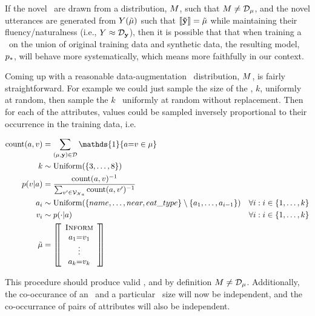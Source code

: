 If the novel \meaningrepresentations~are drawn from a distribution, 
$M$, such that $M \ne \mathcal{D}_{\mu}$, 
and the novel utterances are generated from $Y(\tilde{\mu})$
 such that $\left\llbracket \boldsymbol{\tilde{\mathbf{y}}} \right\rrbracket = \tilde{\mu}$
while maintaining their fluency/naturalness (i.e., $Y \approx \mathcal{D}_{\mathbf{y}}$),
then 
it is possible that that when training a \sequencetosequence~on the union 
of original training data and synthetic data, the resulting model, $p_*$,
 will behave
more systematically, which means more faithfully in our context.

Coming up with a reasonable data-augmentation 
\meaningrepresentation~distribution, $M$, is fairly straightforward.
For example we could just sample the size of the \meaningrepresentation, $k$,
uniformly at random, then sample the $k$ \attributes~uniformly at random 
without replacement. Then for each of the attributes, values could be
sampled inversely proportional to their occurrence in the training data, i.e.
\begin{singlespace}
\begin{align*}
\operatorname{count}(a, v) & = \sum_{(\mr, \utttoks) \in \corpus} \mathds{1}\{\AV{$a$}{$v$} \in \mr  \}\\
k & \sim \operatorname{Uniform}(\{3, \ldots, 8\}) \\
p(v|a) & = \frac{\operatorname{count}(a,v)^{-1}}{\sum_{v^\prime \in {\mrvocab}_a}  \operatorname{count}(a,v^\prime)^{-1}} \\
a_i & \sim \operatorname{Uniform}(\{name, \ldots, near, eat\_type\}\setminus\{a_1,\ldots,a_{i-1}\}) & \forall i: i \in  \{1,\ldots, k\}\\
v_i & \sim p(\cdot|a) & \forall i: i \in \{1,\ldots,k\} \\
\tilde{\mr} & = \left[\!\!\left[ 
\begin{array}{c} 
\textsc{Inform} \\
\AV{$a_1$}{$v_1$} \\ \vdots \\ \AV{$a_k$}{$v_k$}  
\end{array}  
\right]\!\!\right]
\end{align*}\end{singlespace}
This procedure should produce valid \meaningrepresentations, and by 
definition $M \ne \mathcal{D}_{\mu}$. Additionally, the co-occurance
of an \attribute~and a particular \meaningrepresentation~size will now be 
independent, and the co-occurrance of pairs of attributes will also be independent. 


